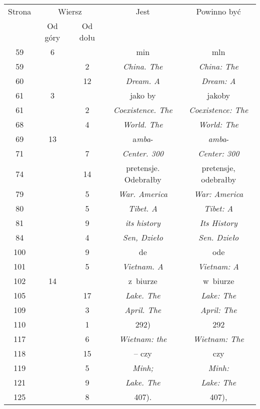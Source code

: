 \documentclass[a4paper,11pt]{article}
\numberwithin{equation}{section}
\begin{document}
\begin{center}
  \newpage

  \begin{tabular}{|c|c|c|c|c|}
    \hline
    Strona & \multicolumn{2}{c|}{Wiersz} & Jest
                              & Powinno być \\ \cline{2-3}
    & Od góry & Od dołu & & \\
    \hline
    59  &  6 & & min & mln \\
    59  & &  2 & \textit{China. The} & \textit{China: The} \\
    60  & & 12 & \textit{Dream. A} & \textit{Dream: A} \\
    61  &  3 & & jako by & jakoby \\
    61  & &  2 & \textit{Coexistence. The} & \textit{Coexistence: The} \\
    68  & &  4 & \textit{World. The} & \textit{World: The} \\
    69  & 13 & & a\textit{mba}- & \textit{amba}- \\
    71  & &  7 & \textit{Center. 300} & \textit{Center: 300} \\
    74  & & 14 & pretensje. Odebrałby & pretensje, odebrałby \\
    79  & &  5 & \textit{War. America} & \textit{War: America} \\
    80  & &  5 & \textit{Tibet. A} & \textit{Tibet: A} \\
    81  & &  9 & \textit{its history} & \textit{Its History} \\
    84  & &  4 & \textit{Sen, Dzieło} & \textit{Sen. Dzieło} \\
    100 & &  9 & de & ode \\
    101 & &  5 & \textit{Vietnam. A} & \textit{Vietnam: A} \\
    102 & 14 & & z~biurze & w~biurze \\
    105 & & 17 & \textit{Lake. The} & \textit{Lake: The} \\
    109 & &  3 & \textit{April. The} & \textit{April: The} \\
    110 & &  1 & 292) & 292 \\
    117 & &  6 & \textit{Wietnam: the} & \textit{Wietnam: The} \\
    118 & & 15 & -- czy & czy \\
    119 & &  5 & \textit{Minh;} & \textit{Minh:} \\
    121 & &  9 & \textit{Lake. The} & \textit{Lake: The} \\
    125 & &  8 & 407). & 407), \\

\end{tabular}
\end{center}
\end{document}
